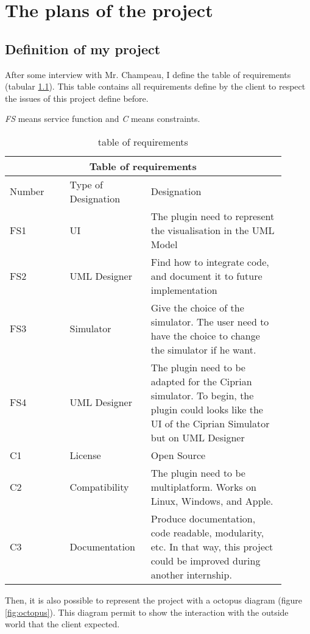 \chapter{The plans of the project}
\label{chap:goals}

\section{Definition of my project}

After some interview with Mr. Champeau, I define the table of requirements (tabular \ref{tab:requirements}). This table contains all requirements define by the client to respect the issues of this project define before.

\textit{FS} means service function and \textit{C} means constraints.

\noindent{}
\begin{table}[!h]
  \centering
  \begin{tabular}[h]{|m{0.2\linewidth}|m{0.25\linewidth}|m{0.45\linewidth}|}
    \hline
    \multicolumn{3}{|c|}{Table of requirements}\\
    \hline
    Number&Type of Designation&Designation\\
    \hline
    FS1&UI&The plugin need to represent the visualisation in the UML Model\\
    \hline
    FS2&UML Designer&Find how to integrate code, and document it to future implementation\\
    \hline
    FS3&Simulator&Give the choice of the simulator. The user need to have the choice to change the simulator if he want.\\
    \hline
    FS4&UML Designer&The plugin need to be adapted for the Ciprian simulator. To begin, the plugin could looks like the UI of the Ciprian Simulator but on UML Designer\\
    \hline
    C1&License&Open Source\\
    \hline
    C2&Compatibility&The plugin need to be multiplatform. Works on Linux, Windows, and Apple.\\
    \hline
    C3&Documentation&Produce documentation, code readable, modularity, etc. In that way, this project could be improved during another internship. \\
    \hline
  \end{tabular}
  \caption{table of requirements}
  \label{tab:requirements}
\end{table}

Then, it is also possible to represent the project with a octopus diagram (figure \ref{fig:octopus}). This diagram permit to show the interaction with the outside world that the client expected.

